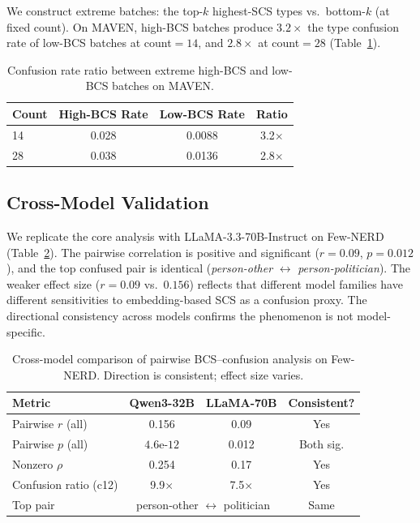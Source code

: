 \documentclass[11pt,a4paper]{article}
\begin{document}
We construct extreme batches: the top-$k$ highest-SCS types vs.\ bottom-$k$ (at fixed count). On MAVEN, high-BCS batches produce $3.2\times$ the type confusion rate of low-BCS batches at count$=14$, and $2.8\times$ at count$=28$ (Table~\ref{tab:confusion_ratio}).

\begin{table}[t]
\centering
\small
\caption{Confusion rate ratio between extreme high-BCS and low-BCS batches on MAVEN.}
\label{tab:confusion_ratio}
\begin{tabular}{lccc}
\toprule
Count & High-BCS Rate & Low-BCS Rate & Ratio \\
\midrule
14 & 0.028 & 0.0088 & 3.2$\times$ \\
28 & 0.038 & 0.0136 & 2.8$\times$ \\
\bottomrule
\end{tabular}
\end{table}

\subsection{Cross-Model Validation}

We replicate the core analysis with LLaMA-3.3-70B-Instruct on Few-NERD (Table~\ref{tab:crossmodel}). The pairwise correlation is positive and significant ($r=0.09$, $p=0.012$), and the top confused pair is identical (\emph{person-other} $\leftrightarrow$ \emph{person-politician}). The weaker effect size ($r=0.09$ vs.\ $0.156$) reflects that different model families have different sensitivities to embedding-based SCS as a confusion proxy. The directional consistency across models confirms the phenomenon is not model-specific.

\begin{table}[t]
\centering
\small
\caption{Cross-model comparison of pairwise BCS--confusion analysis on Few-NERD. Direction is consistent; effect size varies.}
\label{tab:crossmodel}
\begin{tabular}{lccc}
\toprule
Metric & Qwen3-32B & LLaMA-70B & Consistent? \\
\midrule
Pairwise $r$ (all) & 0.156 & 0.09 & Yes \\
Pairwise $p$ (all) & $4.6\text{e-}12$ & 0.012 & Both sig. \\
Nonzero $\rho$ & 0.254 & 0.17 & Yes \\
Confusion ratio (c12) & 9.9$\times$ & 7.5$\times$ & Yes \\
Top pair & \multicolumn{2}{c}{person-other $\leftrightarrow$ politician} & Same \\
\bottomrule
\end{tabular}
\end{table}
\end{document}

